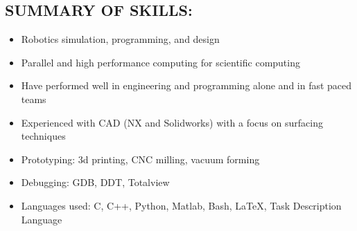\documentclass[margin]{res}
\begin{document}

\address{\bf Current\\ 42 Colvin Circle  \\   Troy, NY 12180  \\ {\bf phone: }(720) 270-3901 \\ {\bf email: }micahcorah@gmail.com}
\address{\bf Permanent\\ 3361 E. Maplewood Ave. \\   Centennial, CO 80121}

\begin{resume}
\vspace{-1.5mm}
\section{SUMMARY OF SKILLS:}
\vspace{10mm}
  \begin{itemize}
    \item Robotics simulation, programming, and design
    \item Parallel and high performance computing for scientific computing
    \item Have performed well in engineering and programming alone and in fast paced teams
    \item Experienced with CAD (NX and Solidworks) with a focus on surfacing techniques
    \item Prototyping: 3d printing, CNC milling, vacuum forming
    \item Debugging: GDB, DDT, Totalview
    \item Languages used: C, C++, Python, Matlab, Bash, \LaTeX, Task Description Language
	\end{itemize}
\vspace{-3.5mm}

\end{resume}
\end{document}
